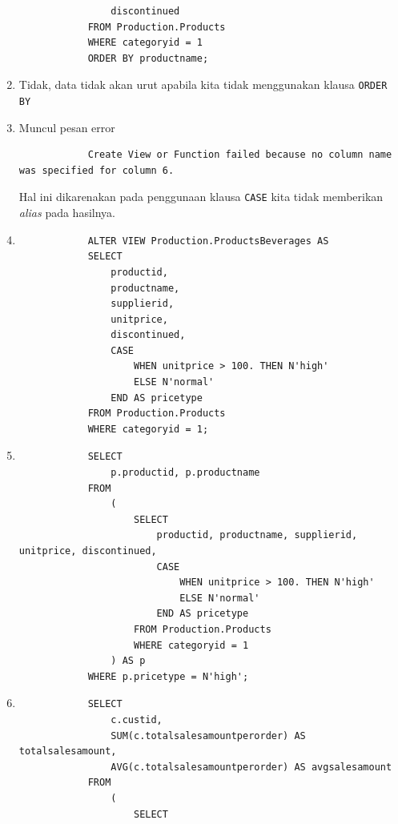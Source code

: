 \documentclass[12pt,titlepage]{article}
\begin{document}
\begin{enumerate}
{\begin{verbatim}
                discontinued
            FROM Production.Products
            WHERE categoryid = 1
            ORDER BY productname;
        \end{verbatim}
    }
    \item {
        Tidak, data tidak akan urut apabila kita tidak menggunakan klausa \texttt{ORDER BY}
    }
    \item {
        Muncul pesan error
        \begin{verbatim}
            Create View or Function failed because no column name was specified for column 6.
        \end{verbatim}
        Hal ini dikarenakan pada penggunaan klausa \texttt{CASE} kita tidak memberikan \textit{alias} pada hasilnya.
    }
    \item {
        \begin{verbatim}
            ALTER VIEW Production.ProductsBeverages AS
            SELECT
                productid,
                productname,
                supplierid,
                unitprice,
                discontinued,
                CASE
                    WHEN unitprice > 100. THEN N'high'
                    ELSE N'normal'
                END AS pricetype
            FROM Production.Products
            WHERE categoryid = 1;
        \end{verbatim}
    }
    \pagebreak
    \item {
        \begin{verbatim}
            SELECT
                p.productid, p.productname
            FROM
                (
                    SELECT
                        productid, productname, supplierid, unitprice, discontinued,
                        CASE
                            WHEN unitprice > 100. THEN N'high'
                            ELSE N'normal'
                        END AS pricetype
                    FROM Production.Products
                    WHERE categoryid = 1
                ) AS p
            WHERE p.pricetype = N'high';
        \end{verbatim}
    }
    \item {
        \begin{verbatim}
            SELECT
                c.custid,
                SUM(c.totalsalesamountperorder) AS totalsalesamount,
                AVG(c.totalsalesamountperorder) AS avgsalesamount
            FROM
                (
                    SELECT

\end{verbatim}}
\end{enumerate}
\end{document}
